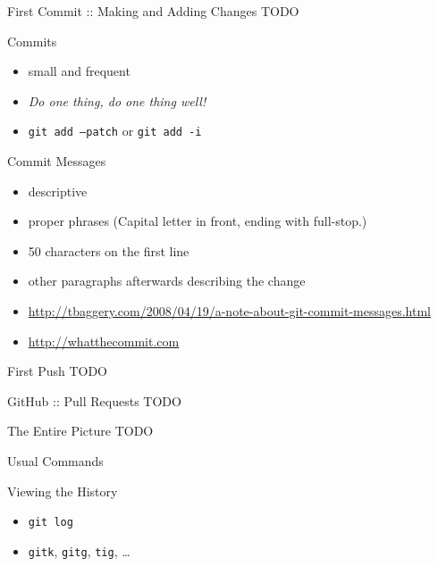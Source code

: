 \documentclass{beamer}
\begin{document}
\begin{frame}{First Commit :: Making and Adding Changes}
  TODO
\end{frame}

\begin{frame}{Commits}
  \begin{itemize}
    \item small and frequent
    \item \textit{Do one thing, do one thing well!}
    \item \texttt{git add --patch} or \texttt{git add -i}
  \end{itemize}
\end{frame}

\begin{frame}{Commit Messages}
  \begin{itemize}
    \item descriptive
    \item proper phrases (Capital letter in front, ending with full-stop.)
    \item 50 characters on the first line
    \item other paragraphs afterwards describing the change
    \scriptsize
    \item
      \url{http://tbaggery.com/2008/04/19/a-note-about-git-commit-messages.html}
    \normalsize
    \item \url{http://whatthecommit.com}
  \end{itemize}
  \begin{center}
  \end{center}
\end{frame}

\begin{frame}{First Push}
  TODO
\end{frame}

\begin{frame}{GitHub :: Pull Requests}
  TODO
\end{frame}

\begin{frame}{The Entire Picture}
  TODO
\end{frame}

\begin{frame}{Usual Commands}
  \begin{center}
  \end{center}
\end{frame}

\begin{frame}{Viewing the History}
  \begin{itemize}
    \item \texttt{git log}
    \item \texttt{gitk}, \texttt{gitg}, \texttt{tig}, \ldots
  \end{itemize}
\end{frame}
\end{document}
